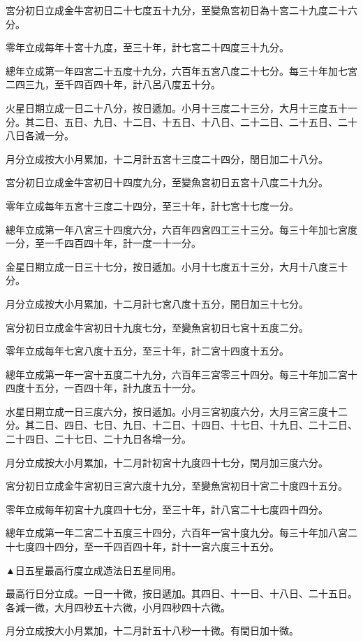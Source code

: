 宮分初日立成金牛宮初日二十七度五十九分，至變魚宮初日為十宮二十九度二十六分。

零年立成每年十宮十九度，至三十年，計七宮二十四度三十九分。

總年立成第一年四宮二十五度十九分，六百年五宮八度二十七分。每三十年加七宮二四三九，至千四百四十年，計八呂八度五十分。

火星日期立成一日二十八分，按日遞加。小月十三度二十三分，大月十三度五十一分。其二日、五日、九日、十二日、十五日、十八日、二十二日、二十五日、二十八日各減一分。

月分立成按大小月累加，十二月計五宮十三度二十四分，閏日加二十八分。

宮分初日立成金牛宮初日十四度九分，至變魚宮初日五宮十八度二十九分。

零年立成每年五宮十三度二十四分，至三十年，計七宮十七度一分。

總年立成第一年八宮三十四度六分，六百年四宮四工三十三分。每三十年加七宮度一分，至一千四百四十年，計一度一十一分。

金星日期立成一日三十七分，按日遞加。小月十七度五十三分，大月十八度三十分。

月分立成按大小月累加，十二月計七宮八度十五分，閏日加三十七分。

宮分初日立成金牛宮初日十九度七分，至變魚宮初日七宮十五度二分。

零年立成每年七宮八度十五分，至三十年，計二宮十四度十五分。

總年立成第一年一宮十五度二十九分，六百年三宮零三十四分。每三十年加二宮十四度十五分，一百四十年，計九度五十一分。

水星日期立成一日三度六分，按日遞加。小月三宮初度六分，大月三宮三度十二分。其二日、四日、七日、九日、十二日、十四日、十七日、十九日、二十二日、二十四日、二十七日、二十九日各增一分。

月分立成按大小月累加，十二月計初宮十九度四十七分，閏月加三度六分。

宮分初日立成金牛宮初日三宮六度十九分，至變魚宮初日十宮二十度四十五分。

零年立成每年初宮十九度四十七分，至三十年，計八宮二十七度四十四分。

總年立成第一年二宮二十五度三十四分，六百年一宮十度九分。每三十年加八宮二十七度四十四分，至一千四百四十年，計十一宮六度三十五分。

▲日五星最高行度立成造法日五星同用。

最高行日分立成。一日一十微，按日遞加。其四日、十一日、十八日、二十五日。各減一微，大月四秒五十六微，小月四秒四十六微。

月分立成按大小月累加，十二月計五十八秒一十微。有閏日加十微。

